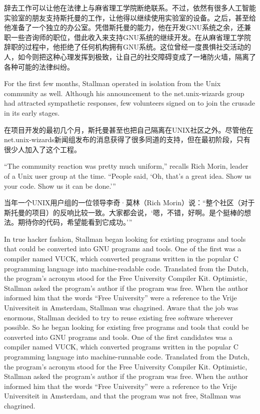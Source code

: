 \ifdefined\chs
辞去工作可以让他在法律上与麻省理工学院断绝联系。不过，依然有很多人工智能实验室的朋友支持斯托曼的工作，让他得以继续使用实验室的设备。\ifdefined\vtwo 之后，甚至给他准备了一个独立的办公室。\fi 凭借斯托曼的能力，他在开发GNU系统之余，还兼职一些咨询师的职位，借此收入来支持GNU系统的继续开发。在从麻省理工学院辞职的过程中，他拒绝了任何机构拥有GNU系统。这位曾经一度畏惧社交活动的人，如今则把这种心理发挥到极致，让自己的社交障碍变成了一堵防火墙，隔离了各种可能的法律纠纷。
\fi

\ifdefined\eng
For the first few months, Stallman operated in isolation from the Unix community as well. Although his announcement to the net.unix-wizards group had attracted sympathetic responses, few volunteers signed on to join the crusade in its early stages.
\fi

\ifdefined\chs
在项目开发的最初几个月，斯托曼甚至也把自己隔离在UNIX社区之外。尽管他在net.unix-wizards新闻组发布的消息获得了很多同道的支持，但在最初阶段，只有很少人加入了这个工程。
\fi

\ifdefined\eng
``The community reaction was pretty much uniform,'' recalls Rich Morin, leader of a Unix user group at the time. ``People said, `Oh, that's a great idea. Show us your code. Show us it can be done.'\hspace{0.01in}''
\fi

\ifdefined\chs
当年一个UNIX用户组的一位领导李奇·莫林（Rich
Morin）说：``整个社区（对于斯托曼的项目）的反响比较一致。大家都会说，`嗯，不错，好啊。是个挺棒的想法。期待你的代码，希望能看到它成功。'\hspace{0.01in}''
\fi

\ifdefined\eng
\ifdefined\vone
In true hacker fashion, Stallman began looking for existing programs and tools that could be converted into GNU programs and tools. One of the first was a compiler named VUCK, which converted programs written in the popular C programming language into machine-readable code. Translated from the Dutch, the program's acronym stood for the Free University Compiler Kit. Optimistic, Stallman asked the program's author if the program was free. When the author informed him that the words ``Free University'' were a reference to the Vrije Universiteit in Amsterdam, Stallman was chagrined.
\fi
\ifdefined\vtwo
Aware that the job was enormous, Stallman decided to try to reuse existing free software wherever possible.  So he began looking for existing free programs and tools that could be converted into GNU programs and tools. One of the first candidates was a compiler named VUCK, which converted programs written in the popular C programming language into machine-runnable code. Translated from the Dutch, the program's acronym stood for the Free University Compiler Kit. Optimistic, Stallman asked the program's author if the program was free. When the author informed him that the words ``Free University'' were a reference to the Vrije Universiteit in Amsterdam, and that the program was not free, Stallman was chagrined.
\fi
\fi

